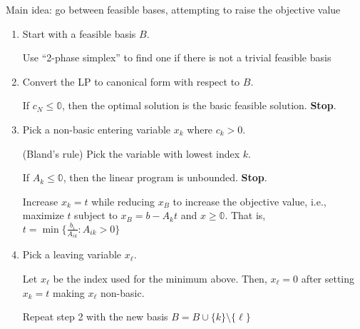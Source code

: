 Main idea: go between feasible bases, attempting to raise the objective value
\begin{enumerate}
  \item Start with a feasible basis $B$.

        Use ``2-phase simplex'' to find one if there is not a trivial feasible basis
  \item Convert the LP to canonical form with respect to $B$.

        If $c_N \leq \mathbb 0$, then the optimal solution is the basic
        feasible solution. \textbf{Stop}.
  \item Pick a non-basic entering variable $x_k$ where $c_k > 0$.

        (Bland's rule) Pick the variable with lowest index $k$.

        If $A_k \leq \mathbb 0$, then the linear program is
        unbounded. \textbf{Stop}.

        Increase $x_k = t$ while reducing $x_B$
        to increase the objective value, i.e., maximize $t$ subject to
        $x_B = b - A_k t$ and $x \geq \mathbb 0$.
        That is,
        $t = \min\{\frac{b_i}{A_{ik}} : A_{ik} > 0\}$
  \item Pick a leaving variable $x_\ell$.

        Let $x_\ell$ be the index used for the minimum
        above. Then, $x_\ell = 0$ after setting $x_k = t$ making $x_\ell$
        non-basic.

        Repeat step 2 with the new basis
        $B = B \cup \{k\} \setminus\{\ell\}$
\end{enumerate}

